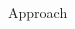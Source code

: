 \documentclass[final,t]{beamer}
\begin{document}
\begin{frame}{}
\begin{columns}[t]
\begin{column}{.4\linewidth}
\begin{block}{Approach}

\end{block}
\end{column}
\end{columns}
\end{frame}
\end{document}
